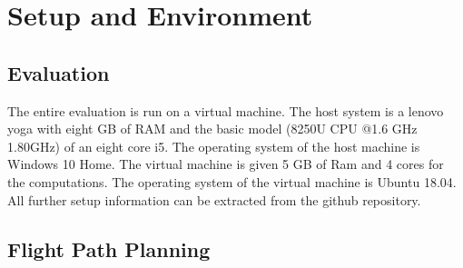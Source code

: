 	
\section{Setup and Environment}

	\subsection{Evaluation}
	
	The entire evaluation is run on a virtual machine. The host system is a lenovo yoga with eight GB of RAM and the basic model (8250U CPU @1.6 
	GHz 1.80GHz) of an eight core i5. The operating system of the host machine is Windows 10 Home. The virtual
	machine is given 5 GB of Ram and 4 cores for the computations. The operating system of the virtual machine is Ubuntu 18.04. All further setup information can be extracted 
	from the github repository.

	\subsection{Flight Path Planning}